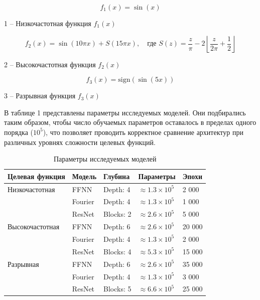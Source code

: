 \documentclass[a4paper,14pt]{extarticle}
\numberwithin{equation}{section}
\begin{document}
\begin{equation*}
f_1(x) = \sin(x)
\end{equation*}
\begin{center}
    1 – Низкочастотная функция $f_1(x)$
\end{center}

\begin{equation*}
f_2(x) = \sin(10\pi x) + S(15\pi x), \quad \text{где } S(z) = \frac{z}{\pi} - 2\left\lfloor \frac{z}{2\pi} + \frac{1}{2} \right\rfloor
\end{equation*}
\begin{center}
    2 – Высокочастотная функция $f_2(x)$
\end{center}

\[ f_3(x) = \text{sign}(\sin(5x)) \]

\begin{center}
    3 – Разрывная функция $f_3(x)$
\end{center}

\vspace{1em}
В таблице 1 представлены параметры исследуемых моделей. Они подбирались таким образом, чтобы число обучаемых параметров оставалось в пределах одного порядка ($10^5$), что позволяет проводить корректное сравнение архитектур при различных уровнях сложности целевых функций.

\begin{table}[htbp]
\centering
\caption{Параметры исследуемых моделей}
\begin{tabular}{|l|l|l|l|l|}
\hline
\textbf{Целевая функция} & \textbf{Модель} & \textbf{Глубина} & \textbf{Параметры} & \textbf{Эпохи} \\ \hline
Низкочастотная & FFNN & Depth: 4 & $\approx 1.3 \times 10^5$ & 2 000 \\ \hline
 & Fourier & Depth: 4 & $\approx 1.3 \times 10^5$ & 1 000 \\ \hline
 & ResNet & Blocks: 2 & $\approx 2.6 \times 10^5$ & 5 000 \\ \hline
Высокочастотная & FFNN & Depth: 6 & $\approx 2.6 \times 10^5$ & 20 000 \\ \hline
 & Fourier & Depth: 4 & $\approx 1.3 \times 10^5$ & 2 000 \\ \hline
 & ResNet & Blocks: 4 & $\approx 5.3 \times 10^5$ & 15 000 \\ \hline
Разрывная & FFNN & Depth: 6 & $\approx 2.6 \times 10^5$ & 35 000 \\ \hline
 & Fourier & Depth: 4 & $\approx 1.3 \times 10^5$ & 3 000 \\ \hline
 & ResNet & Blocks: 5 & $\approx 6.6 \times 10^5$ & 25 000 \\ \hline
\end{tabular}
\end{table}
\end{document}
